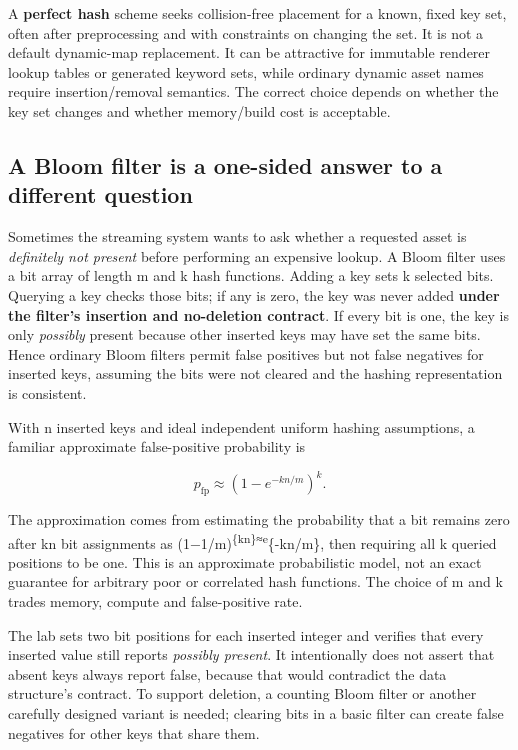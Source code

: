 A \textbf{perfect hash} scheme seeks collision-free placement for a known, fixed key set, often after preprocessing and with constraints on changing the set. It is not a default dynamic-map replacement. It can be attractive for immutable renderer lookup tables or generated keyword sets, while ordinary dynamic asset names require insertion/removal semantics. The correct choice depends on whether the key set changes and whether memory/build cost is acceptable.

\subsection{A Bloom filter is a one-sided answer to a different question}\label{05-engine-i-ch007-a-bloom-filter-is-a-one-sided-answer-to-a-different-question}

Sometimes the streaming system wants to ask whether a requested asset is \emph{definitely not present} before performing an expensive lookup. A Bloom filter uses a bit array of length m and k hash functions. Adding a key sets k selected bits. Querying a key checks those bits; if any is zero, the key was never added \textbf{under the filter's insertion and no-deletion contract}. If every bit is one, the key is only \emph{possibly} present because other inserted keys may have set the same bits. Hence ordinary Bloom filters permit false positives but not false negatives for inserted keys, assuming the bits were not cleared and the hashing representation is consistent.

With n inserted keys and ideal independent uniform hashing assumptions, a familiar approximate false-positive probability is

\[
p_{\mathrm{fp}}\approx\left(1-e^{-kn/m}\right)^k.
\]

The approximation comes from estimating the probability that a bit remains zero after kn bit assignments as (1−1/m)\textsuperscript{\{kn\}≈e}\{-kn/m\}, then requiring all k queried positions to be one. This is an approximate probabilistic model, not an exact guarantee for arbitrary poor or correlated hash functions. The choice of m and k trades memory, compute and false-positive rate.

The lab sets two bit positions for each inserted integer and verifies that every inserted value still reports \emph{possibly present}. It intentionally does not assert that absent keys always report false, because that would contradict the data structure's contract. To support deletion, a counting Bloom filter or another carefully designed variant is needed; clearing bits in a basic filter can create false negatives for other keys that share them.

